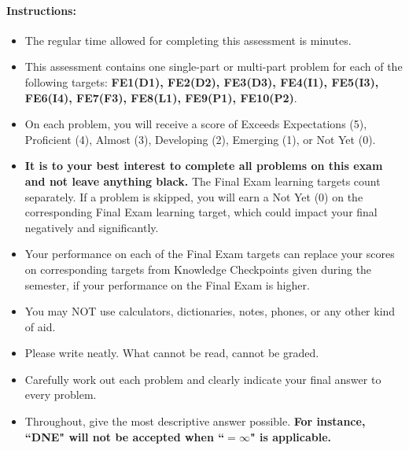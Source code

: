 \documentclass[11pt]{article}
\begin{document}
{\small

\paragraph*{Instructions:}

\begin{itemize}
    
    \item The regular time allowed for completing this assessment is  minutes.
    \item This assessment contains one single-part or multi-part problem for each of the following targets: \textbf{FE1(D1), FE2(D2), FE3(D3), FE4(I1), FE5(I3), FE6(I4), FE7(F3), FE8(L1), FE9(P1), FE10(P2)}.
    \item On each problem, you will receive a score of Exceeds Expectations (5), Proficient (4), Almost (3), Developing (2), Emerging (1), or Not Yet (0). %
    \item \textbf{It is to your best interest to complete all problems on this exam and not leave anything black.} The Final Exam learning targets count separately. If a problem is skipped, you will earn a Not Yet (0) on the corresponding Final Exam learning target, which could impact your final negatively and significantly.
    \item Your performance on each of the Final Exam targets can replace your scores on corresponding targets from Knowledge Checkpoints given during the semester, if your performance on the Final Exam is higher.
    \item You may NOT use calculators, dictionaries, notes, phones, or any other kind of aid.
    \item Please write neatly. What cannot be read, cannot be graded.
    \item Carefully work out each problem and clearly indicate your final answer to every problem.
    \item Throughout, give the most descriptive answer possible. \textbf{For instance, ``DNE" will not be accepted when ``$=\infty$" is applicable.}

\end{itemize}}
\end{document}
